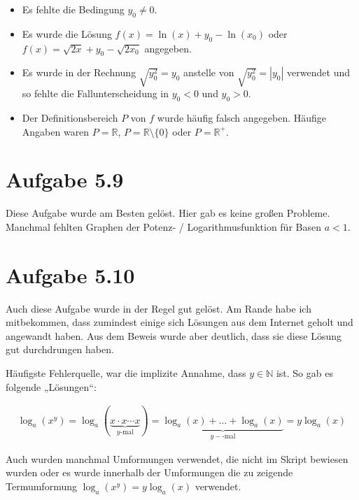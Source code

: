 \documentclass[a4paper]{article}
\newcommand*{\R}{\mathbb R}
\newcommand*{\N}{\mathbb N}
\begin{document}
\begin{itemize}
  \item Es fehlte die Bedingung $y_0\neq 0$.
  \item Es wurde die Lösung $f(x)=\ln(x)+y_0-\ln(x_0)$ oder $f(x)=\sqrt{2x}+y_0-\sqrt{2x_0}$ angegeben.
  \item Es wurde in der Rechnung $\sqrt{y_0^2}=y_0$ anstelle von $\sqrt{y_0^2}=|y_0|$ verwendet und so fehlte die Fallunterscheidung in $y_0 < 0$ und $y_0>0$.
  \item Der Definitionsbereich $P$ von $f$ wurde häufig falsch angegeben. Häufige Angaben waren $P=\R$, $P=\R\setminus\{0\}$ oder $P=\R^{+}$.
\end{itemize}

\section{Aufgabe 5.9}

Diese Aufgabe wurde am Besten gelöst. Hier gab es keine großen Probleme. Manchmal fehlten Graphen der Potenz- / Logarithmusfunktion für Basen $a<1$.

\section{Aufgabe 5.10}

Auch diese Aufgabe wurde in der Regel gut gelöst. Am Rande habe ich mitbekommen, dass zumindest einige sich Lösungen aus dem Internet geholt und angewandt haben. Aus dem Beweis wurde aber deutlich, dass sie diese Lösung gut durchdrungen haben.

Häufigste Fehlerquelle, war die implizite Annahme, dass $y\in\N$ ist. So gab es folgende „Lösungen“:

\begin{align}
  \log_a\left(x^y\right) = \log_a\left(\underbrace{x\cdot x\cdots x}_{y\text{-mal}}\right) = \underbrace{\log_a(x)+\dots + \log_a(x)}_{y-\text{-mal}} = y \log_a(x)
\end{align}

Auch wurden manchmal Umformungen verwendet, die nicht im Skript bewiesen wurden oder es wurde innerhalb der Umformungen die zu zeigende Termumformung $\log_a(x^y)=y\log_a(x)$ verwendet.
\end{document}

